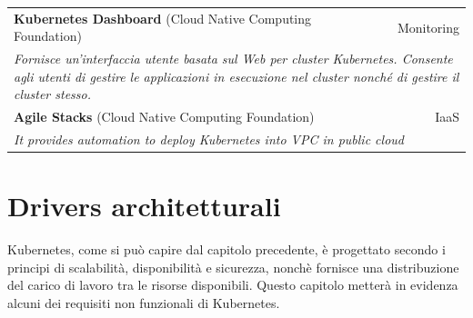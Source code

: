 \documentclass[12pt, a4paper]{report}
\begin{document}
\begin{table}[ht]
\begin{center}
\begin{tabularx}{\textwidth}{|lr|}
    \hline
    \textbf{Kubernetes Dashboard} (Cloud Native Computing Foundation)&Monitoring\\
    \multicolumn{2}{|X|}{\textit{Fornisce un'interfaccia utente basata sul Web per cluster Kubernetes. Consente agli utenti di gestire le applicazioni in esecuzione nel cluster nonché di gestire il cluster stesso.}}\\
    \hline
    \textbf{Agile Stacks} (Cloud Native Computing Foundation)& IaaS\\
    \multicolumn{2}{|X|}{\textit{It provides automation to deploy Kubernetes into VPC in public cloud}}\\
    \hline
  \end{tabularx}
  \end{center}
\end{table}
\chapter{Drivers architetturali}
Kubernetes, come si può capire dal capitolo precedente, è progettato secondo i principi di scalabilità, disponibilità e sicurezza, nonchè fornisce una distribuzione del carico di lavoro tra le risorse disponibili. Questo capitolo metterà in evidenza alcuni dei requisiti non funzionali di Kubernetes.
\end{document}
